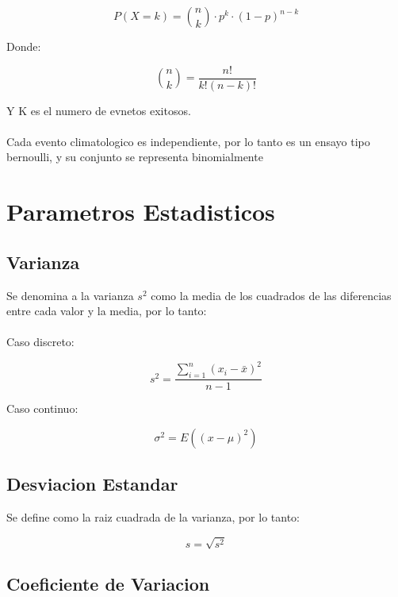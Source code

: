 \begin{equation}
    P(X = k) = \binom{n}{k} \cdot p^k \cdot (1-p)^{n-k}
\end{equation}

Donde:

\begin{equation}
    \binom{n}{k} = \frac{n!}{k!(n-k)!}
\end{equation}

Y K es el numero de evnetos exitosos.
\\ \\
Cada evento climatologico es independiente, por lo tanto es un ensayo tipo bernoulli, y su conjunto se representa binomialmente

\section{Parametros Estadisticos}

\subsection{Varianza}

Se denomina a la varianza \textbf{$s^2$} como la media de los cuadrados de las diferencias entre cada valor y la media, por lo tanto:
\\ \\
Caso discreto: 

\begin{equation}
    s^2 = \frac{\sum_{i=1}^{n} (x_i - \bar{x})^2}{n-1}
\end{equation}

Caso continuo:

\begin{equation}
    \sigma^2 = E((x-\mu)^2)
\end{equation}

\subsection{Desviacion Estandar}

Se define como la raiz cuadrada de la varianza, por lo tanto:

\begin{equation}
    s = \sqrt{s^2}
\end{equation}

\subsection{Coeficiente de Variacion}

